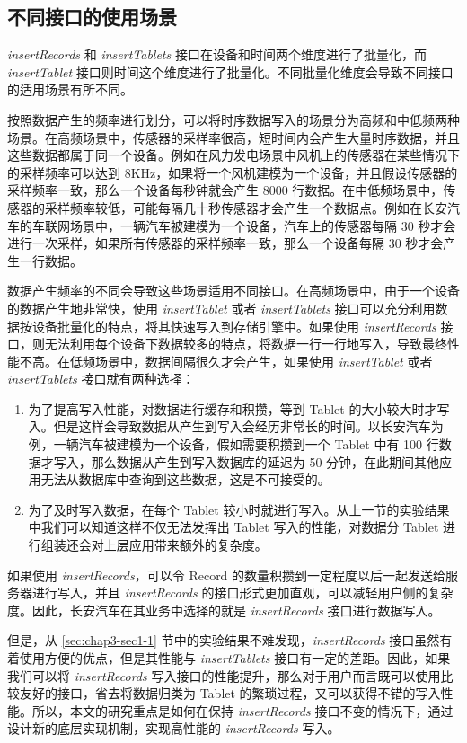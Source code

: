 \subsection{不同接口的使用场景}
\emph{insertRecords} 和 \emph{insertTablets} 接口在设备和时间两个维度进行了批量化，而 \emph{insertTablet} 接口则时间这个维度进行了批量化。不同批量化维度会导致不同接口的适用场景有所不同。

按照数据产生的频率进行划分，可以将时序数据写入的场景分为高频和中低频两种场景。在高频场景中，传感器的采样率很高，短时间内会产生大量时序数据，并且这些数据都属于同一个设备。例如在风力发电场景中风机上的传感器在某些情况下的采样频率可以达到 8KHz\cite{李天安2020apache}，如果将一个风机建模为一个设备，并且假设传感器的采样频率一致，那么一个设备每秒钟就会产生 8000 行数据。在中低频场景中，传感器的采样频率较低，可能每隔几十秒传感器才会产生一个数据点。例如在长安汽车的车联网场景中，一辆汽车被建模为一个设备，汽车上的传感器每隔 30 秒才会进行一次采样，如果所有传感器的采样频率一致，那么一个设备每隔 30 秒才会产生一行数据。

数据产生频率的不同会导致这些场景适用不同接口。在高频场景中，由于一个设备的数据产生地非常快，使用 \emph{insertTablet} 或者 \emph{insertTablets} 接口可以充分利用数据按设备批量化的特点，将其快速写入到存储引擎中。如果使用 \emph{insertRecords} 接口，则无法利用每个设备下数据较多的特点，将数据一行一行地写入，导致最终性能不高。在低频场景中，数据间隔很久才会产生，如果使用 \emph{insertTablet} 或者 \emph{insertTablets} 接口就有两种选择：
\begin{enumerate}
  \item 为了提高写入性能，对数据进行缓存和积攒，等到 Tablet 的大小较大时才写入。但是这样会导致数据从产生到写入会经历非常长的时间。以长安汽车为例，一辆汽车被建模为一个设备，假如需要积攒到一个 Tablet 中有 100 行数据才写入，那么数据从产生到写入数据库的延迟为 50 分钟，在此期间其他应用无法从数据库中查询到这些数据，这是不可接受的。
  \item 为了及时写入数据，在每个 Tablet 较小时就进行写入。从上一节的实验结果中我们可以知道这样不仅无法发挥出 Tablet 写入的性能，对数据分 Tablet 进行组装还会对上层应用带来额外的复杂度。
\end{enumerate}
如果使用 \emph{insertRecords}，可以令 Record 的数量积攒到一定程度以后一起发送给服务器进行写入，并且 \emph{insertRecords} 的接口形式更加直观，可以减轻用户侧的复杂度。因此，长安汽车在其业务中选择的就是 \emph{insertRecords} 接口进行数据写入。

但是，从 \ref{sec:chap3-sec1-1} 节中的实验结果不难发现，\emph{insertRecords} 接口虽然有着使用方便的优点，但是其性能与 \emph{insertTablets} 接口有一定的差距。因此，如果我们可以将 \emph{insertRecords} 写入接口的性能提升，那么对于用户而言既可以使用比较友好的接口，省去将数据归类为 Tablet 的繁琐过程，又可以获得不错的写入性能。所以，本文的研究重点是如何在保持 \emph{insertRecords} 接口不变的情况下，通过设计新的底层实现机制，实现高性能的 \emph{insertRecords} 写入。


